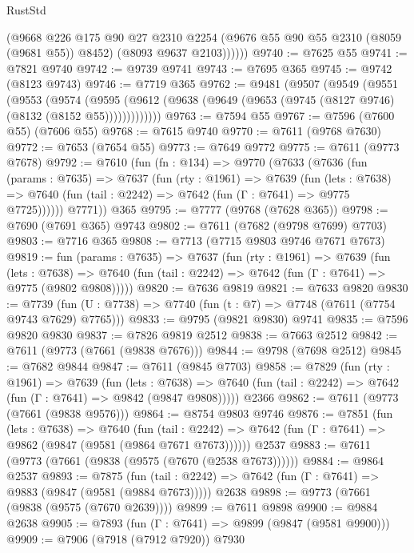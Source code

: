\begin{lexlean}{RustStd}
\begin{coremodule}
{\begin{coremodule}
{{{{{{{{{{{{{{{{{{{{{{{{{{{{{{{{{{            (@9668
              @226
              @175
              @90
              @27
              @2310
              @2254
              (@9676 @55 @90 @55 @2310 (@8059 (@9681 @55)) @8452)
              (@8093 @9637 @2103))))))
@9740 := @7625 @55
@9741 := @7821 @9740
@9742 := @9739 @9741
@9743 := @7695 @365
@9745 := @9742 (@8123 @9743)
@9746 := @7719 @365
@9762 := @9481
    (@9507
      (@9549
        (@9551
          (@9553
            (@9574
              (@9595 (@9612 (@9638 (@9649 (@9653 (@9745 (@8127 @9746) (@8132 (@8152 @55)))))))))))))
@9763 := @7594 @55
@9767 := @7596 (@7600 @55) (@7606 @55)
@9768 := @7615 @9740
@9770 := @7611 (@9768 @7630)
@9772 := @7653 (@7654 @55)
@9773 := @7649 @9772
@9775 := @7611 (@9773 @7678)
@9792 := @7610
    (fun (fn : @134) =>
    @9770
      (@7633
        (@7636
          (fun (params : @7635) =>
          @7637
            (fun (rty : @1961) =>
            @7639
              (fun (lets : @7638) =>
              @7640 (fun (tail : @2242) => @7642 (fun (Γ : @7641) => @9775 @7725))))))
        @7771))
    @365
@9795 := @7777 (@9768 (@7628 @365))
@9798 := @7690 (@7691 @365) @9743
@9802 := @7611 (@7682 (@9798 @7699) @7703)
@9803 := @7716 @365
@9808 := @7713 (@7715 @9803 @9746 @7671 @7673)
@9819 := fun (params : @7635) =>
  @7637
    (fun (rty : @1961) =>
    @7639
      (fun (lets : @7638) =>
      @7640 (fun (tail : @2242) => @7642 (fun (Γ : @7641) => @9775 (@9802 @9808)))))
@9820 := @7636 @9819
@9821 := @7633 @9820
@9830 := @7739 (fun (U : @7738) => @7740 (fun (t : @7) => @7748 (@7611 (@7754 @9743 @7629) @7765)))
@9833 := @9795 (@9821 @9830) @9741
@9835 := @7596 @9820 @9830
@9837 := @7826 @9819 @2512
@9838 := @7663 @2512
@9842 := @7611 (@9773 (@7661 (@9838 @7676)))
@9844 := @9798 (@7698 @2512)
@9845 := @7682 @9844
@9847 := @7611 (@9845 @7703)
@9858 := @7829
    (fun (rty : @1961) =>
    @7639
      (fun (lets : @7638) =>
      @7640 (fun (tail : @2242) => @7642 (fun (Γ : @7641) => @9842 (@9847 @9808)))))
    @2366
@9862 := @7611 (@9773 (@7661 (@9838 @9576)))
@9864 := @8754 @9803 @9746
@9876 := @7851
    (fun (lets : @7638) =>
    @7640
      (fun (tail : @2242) => @7642 (fun (Γ : @7641) => @9862 (@9847 (@9581 (@9864 @7671 @7673))))))
    @2537
@9883 := @7611 (@9773 (@7661 (@9838 (@9575 (@7670 (@2538 @7673))))))
@9884 := @9864 @2537
@9893 := @7875
    (fun (tail : @2242) => @7642 (fun (Γ : @7641) => @9883 (@9847 (@9581 (@9884 @7673)))))
    @2638
@9898 := @9773 (@7661 (@9838 (@9575 (@7670 @2639))))
@9899 := @7611 @9898
@9900 := @9884 @2638
@9905 := @7893 (fun (Γ : @7641) => @9899 (@9847 (@9581 @9900)))
@9909 := @7906 (@7918 (@7912 @7920)) @7930
}}}}}}}}}}}}}}}}}}}}}}}}}}}}}}}}}}
\end{coremodule}}
\end{coremodule}
\end{lexlean}
